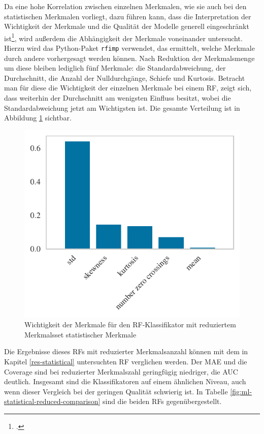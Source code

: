 Da eine hohe Korrelation zwischen einzelnen Merkmalen, wie sie auch bei den statistischen Merkmalen vorliegt, dazu führen kann, dass die Interpretation der Wichtigkeit der Merkmale und die Qualität der Modelle generell eingeschränkt ist\footcite[Kapitel 8]{Harrison2019}, wird außerdem die Abhängigkeit der Merkmale voneinander untersucht. Hierzu wird das Python-Paket \texttt{rfimp} verwendet, das ermittelt, welche Merkmale durch andere vorhergesagt werden können. Nach Reduktion der Merkmalsmenge um diese bleiben lediglich fünf Merkmale: die Standardabweichung, der Durchschnitt, die Anzahl der Nulldurchgänge, Schiefe und Kurtosis. Betracht man für diese die Wichtigkeit der einzelnen Merkmale bei einem \acl{RF}, zeigt sich, dass weiterhin der Durchschnitt am wenigsten Einfluss besitzt, wobei die Standardabweichung jetzt am Wichtigsten ist. Die gesamte Verteilung ist in Abbildung \ref{fig:rf-statistical-reduced} sichtbar.

\begin{figure}[H]
	\centering
	\includegraphics[scale=0.85]{pic/rf-reduced-statistical.pdf}
	\caption{Wichtigkeit der Merkmale für den \ac{RF}-Klassifikator mit reduziertem Merkmalsset statistischer Merkmale}
	\label{fig:rf-statistical-reduced}
\end{figure}

Die Ergebnisse dieses \acl{RF}s mit reduzierter Merkmalsanzahl können mit dem in Kapitel \ref{res-statistical} untersuchten \acl{RF} verglichen werden. Der \ac{MAE} und die Coverage sind bei reduzierter Merkmalszahl geringfügig niedriger, die AUC deutlich. Insgesamt sind die Klassifikatoren auf einem ähnlichen Niveau, auch wenn dieser Vergleich bei der geringen Qualität schwierig ist. In Tabelle \ref{fig:ml-statistical-reduced-comparison} sind die beiden \acl{RF}s gegenübergestellt.

